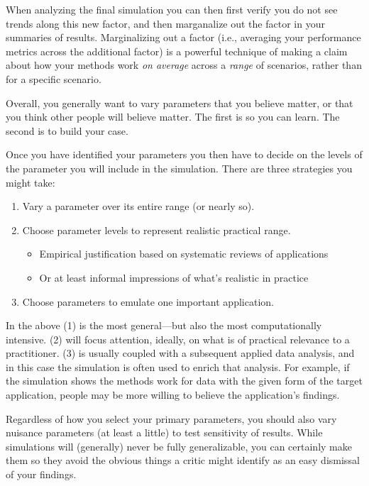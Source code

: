 \documentclass[
]{book}
\providecommand{\tightlist}{%
  \setlength{\itemsep}{0pt}\setlength{\parskip}{0pt}}
\begin{document}
When analyzing the final simulation you can then first verify you do not see trends along this new factor, and then marganalize out the factor in your summaries of results.
Marginalizing out a factor (i.e., averaging your performance metrics across the additional factor) is a powerful technique of making a claim about how your methods work \emph{on average} across a \emph{range} of scenarios, rather than for a specific scenario.

Overall, you generally want to vary parameters that you believe matter, or that you think other people will believe matter.
The first is so you can learn.
The second is to build your case.

Once you have identified your parameters you then have to decide on the levels of the parameter you will include in the simulation.
There are three strategies you might take:

\begin{enumerate}
\def\labelenumi{\arabic{enumi}.}
\tightlist
\item
  Vary a parameter over its entire range (or nearly so).
\item
  Choose parameter levels to represent realistic practical range.

  \begin{itemize}
  \tightlist
  \item
    Empirical justification based on systematic reviews of applications
  \item
    Or at least informal impressions of what's realistic in practice
  \end{itemize}
\item
  Choose parameters to emulate one important application.
\end{enumerate}

In the above (1) is the most general---but also the most computationally intensive.
(2) will focus attention, ideally, on what is of practical relevance to a practitioner.
(3) is usually coupled with a subsequent applied data analysis, and in this case the simulation is often used to enrich that analysis.
For example, if the simulation shows the methods work for data with the given form of the target application, people may be more willing to believe the application's findings.

Regardless of how you select your primary parameters, you should also vary nuisance parameters (at least a little) to test sensitivity of results.
While simulations will (generally) never be fully generalizable, you can certainly make them so they avoid the obvious things a critic might identify as an easy dismissal of your findings.
\end{document}
